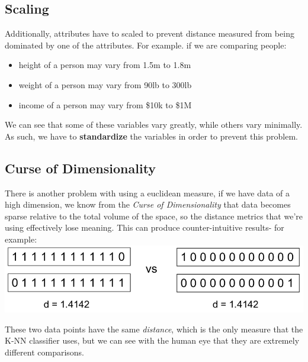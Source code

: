 \documentclass[english, 10pt]{article}
\begin{document}
\subsection{Scaling}

Additionally, attributes have to scaled to prevent distance measured from being dominated by one of the attributes. For example. if we are comparing people:\\

\begin{myproof}
\begin{itemize}
	\item height of a person may vary from 1.5m to 1.8m
	\item weight of a person may vary from 90lb to 300lb
	\item income of a person may vary from \$10k to \$1M
\end{itemize}
\end{myproof}

\hfill \break We can see that some of these variables vary greatly, while others vary minimally. As such, we have to \textbf{standardize} the variables in order to prevent this problem.

\subsection{Curse of Dimensionality}

There is another problem with using a euclidean measure, if we have data of a high dimension, we know from the \textit{Curse of Dimensionality} that data becomes sparse relative to the total volume of the space, so the distance metrics that we're using effectively lose meaning. This can produce counter-intuitive results- for example:\\

{
\centering
\includegraphics[scale=0.55]{img/cursedim.png} 
}

These two data points have the same \textit{distance}, which is the only measure that the K-NN classifier uses, but we can see with the human eye that they are extremely different comparisons.\\
\end{document}
